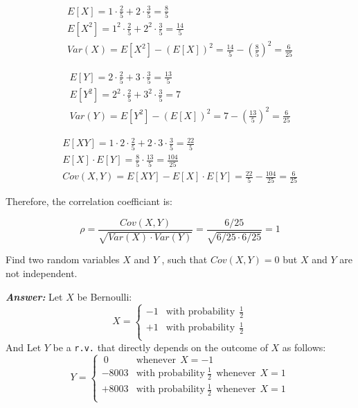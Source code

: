 \documentclass[12pt]{article}
\newenvironment{question}[2][Question]{\begin{trivlist}
\item[\hskip \labelsep {\bfseries #1}\hskip \labelsep {\bfseries #2.}]}{\end{trivlist}}
\begin{document}
\begin{align*}
E[X] = 1 \cdot \frac{2}{5} +  2 \cdot \frac{3}{5} = \frac{8}{5}        \\
E[X^2] = 1^2 \cdot  \frac{2}{5} +  2^2 \cdot \frac{3}{5} = \frac{14}{5}  \\
Var(X) = E[X^2]  - (E[X])^2 =  \frac{14}{5} - \left(\frac{8}{5} \right)^2 = \frac{6}{25}
\end{align*}


\begin{align*}
E[Y] = 2 \cdot \frac{2}{5} +  3 \cdot \frac{3}{5} = \frac{13}{5}        \\
E[Y^2] = 2^2 \cdot  \frac{2}{5} +  3^2 \cdot \frac{3}{5} = 7  \\
Var(Y) = E[Y^2]  - (E[X])^2 =  7 - \left(\frac{13}{5} \right)^2 = \frac{6}{25}
\end{align*}
 

\begin{align*}
E[XY] = 1 \cdot 2 \cdot \frac{2}{5} +  2 \cdot 3 \cdot \frac{3}{5} = \frac{22}{5}        \\
E[X] \cdot E[Y] = \frac{8}{5} \cdot \frac{13}{5} = \frac{104}{25}  \\
Cov(X,Y) = E[XY] - E[X] \cdot E[Y] = \frac{22}{5}  -  \frac{104}{25} = \frac{6}{25}
\end{align*}

Therefore, the correlation coefficiant is:

$$
\rho = \frac{Cov(X,Y)} {\sqrt{ Var(X) \cdot Var(Y) }} = \frac{6/25} {\sqrt{6/25 \cdot 6/25}} = 1
$$


\bigskip
\bigskip
\begin{question}{3.2}

Find two random variables $X$ and $Y$ , such that $Cov(X, Y ) = 0$ but $X$ and $Y$ are not independent.

\end{question}

 \textbf{\color{TealBlue}\emph{Answer:} } 
Let $X$ be Bernoulli:
  \[ 
X = 
  \begin{cases} 
       -1    &  \text{with probability} \ \   \frac{1}{2} \\
       +1  &  \text{with probability}  \ \ \frac{1}{2} \\
   \end{cases}
\]
And Let $Y$ be a \texttt{r.v.} that directly depends on the outcome of $X$ as follows:
\[
Y = 
  \begin{cases} 
        \ 0  &  \text{whenever} \ \  X = -1 \\
       -8003    &  \text{with probability}\  \frac{1}{2} \ \   \text{whenever}  \ \ X = 1  \\
        +8003   &    \text{with probability}\  \frac{1}{2}  \ \ \text{whenever} \ \ X = 1  \\
   \end{cases}
\]
\end{document}
